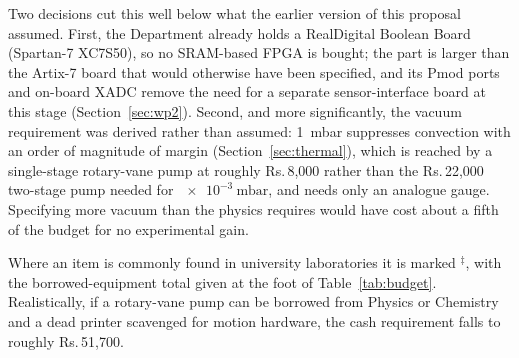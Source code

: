\documentclass[11pt,a4paper]{article}
\newcommand{\rupee}{\textrm{Rs.}}
\begin{document}
Two decisions cut this well below what the earlier version of this proposal
assumed. First, the Department already holds a RealDigital Boolean Board
(Spartan-7 XC7S50), so no SRAM-based FPGA is bought; the part is larger than the
Artix-7 board that would otherwise have been specified, and its Pmod ports and
on-board XADC remove the need for a separate sensor-interface board at this
stage (Section~\ref{sec:wp2}). Second, and more significantly, the vacuum requirement
was derived rather than assumed: \SI{1}{\milli\bar} suppresses convection with an
order of magnitude of margin (Section~\ref{sec:thermal}), which is reached by a
single-stage rotary-vane pump at roughly \rupee\,8{,}000 rather than the
\rupee\,22{,}000 two-stage pump needed for \(\SI{e-3}{\milli\bar}\), and needs
only an analogue gauge. Specifying more vacuum than the physics requires would
have cost about a fifth of the budget for no experimental gain.

Where an item is commonly found in university laboratories it is marked
\(^{\ddagger}\), with the borrowed-equipment total given at the foot of
Table~\ref{tab:budget}. Realistically, if a rotary-vane pump can be borrowed from
Physics or Chemistry and a dead printer scavenged for motion hardware, the cash
requirement falls to roughly \rupee\,51{,}700.
\end{document}
